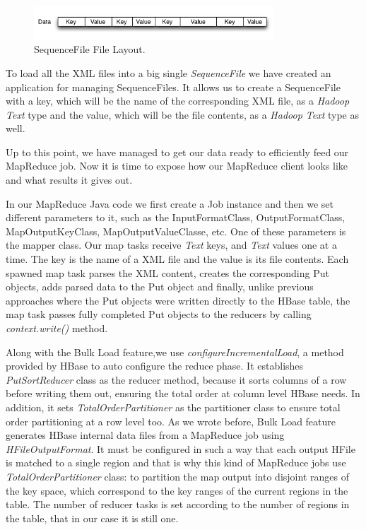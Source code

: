\begin{figure}[htb]
\centering
\includegraphics[width=0.8\textwidth]{./images/sequencefile.png}
\caption{SequenceFile File Layout.} \label{fig:sequencefile}
\end{figure}


To load all the XML files into a big single \textit{SequenceFile} we have created an application for managing SequenceFiles. It allows us to create a SequenceFile with a key, which will be the name of the corresponding XML file, as a \textit{Hadoop Text} type and the value, which will be the file contents, as a \textit{Hadoop Text} type as well.
\par
Up to this point, we have managed to get our data ready to efficiently feed our MapReduce job. Now  it is time to expose how our MapReduce client looks like and what results it gives out.

\bigskip



In our MapReduce Java code we first create a Job instance and then we set different parameters to it, such as the InputFormatClass, OutputFormatClass, MapOutputKeyClass, MapOutputValueClasse, etc. One of these parameters is the mapper class. Our map tasks receive \textit{Text} keys, and \textit{Text} values one at a time. The key is the name of a XML file and the value is its file contents. Each spawned map task parses the XML content, creates the corresponding Put objects, adds parsed data to the Put object and finally, unlike previous approaches where the Put objects were written directly to the HBase table, the map task passes fully completed Put objects to the reducers by calling \textit{context.write()} method.
\par
Along with the Bulk Load feature,we use \textit{configureIncrementalLoad}, a method provided by HBase to auto configure the reduce phase. It establishes \textit{PutSortReducer} class as the reducer method, because it sorts columns of a row before writing them out, ensuring the total order at column level HBase needs. In addition, it sets \textit{TotalOrderPartitioner} as the partitioner class to ensure total order partitioning at a row level too. As we wrote before, Bulk Load feature generates HBase internal data files from a MapReduce job using \textit{HFileOutputFormat}. It must be configured in such a way that each output HFile is matched to a single region and that is why this kind of MapReduce jobs use \textit{TotalOrderPartitioner} class: to partition the map output into disjoint ranges of the key space, which correspond to the key ranges of the current regions in the table. The number of reducer tasks is set according to the number of regions in the table, that in our case it is still one.

